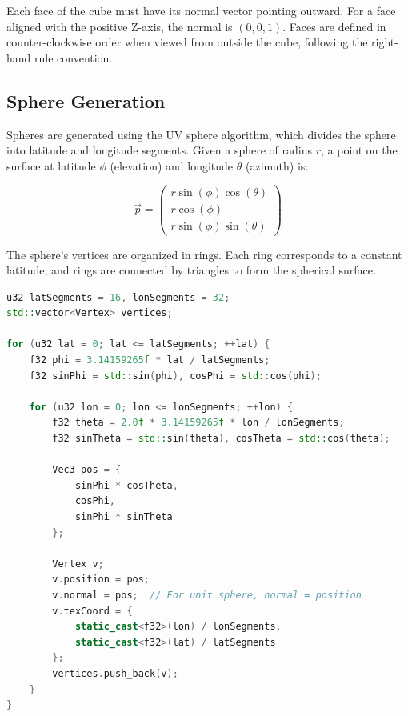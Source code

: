 Each face of the cube must have its normal vector pointing outward. For a face aligned with the positive Z-axis, the normal is $(0, 0, 1)$. Faces are defined in counter-clockwise order when viewed from outside the cube, following the right-hand rule convention.

\subsection{Sphere Generation}

Spheres are generated using the UV sphere algorithm, which divides the sphere into latitude and longitude segments. Given a sphere of radius $r$, a point on the surface at latitude $\phi$ (elevation) and longitude $\theta$ (azimuth) is:

\begin{equation}
    \vec{p} = \begin{pmatrix} r \sin(\phi) \cos(\theta) \\ r \cos(\phi) \\ r \sin(\phi) \sin(\theta) \end{pmatrix}
\end{equation}

The sphere's vertices are organized in rings. Each ring corresponds to a constant latitude, and rings are connected by triangles to form the spherical surface.

\begin{lstlisting}[language=C++, caption=UV Sphere Generation, basicstyle=\ttfamily\small]
u32 latSegments = 16, lonSegments = 32;
std::vector<Vertex> vertices;

for (u32 lat = 0; lat <= latSegments; ++lat) {
    f32 phi = 3.14159265f * lat / latSegments;
    f32 sinPhi = std::sin(phi), cosPhi = std::cos(phi);
    
    for (u32 lon = 0; lon <= lonSegments; ++lon) {
        f32 theta = 2.0f * 3.14159265f * lon / lonSegments;
        f32 sinTheta = std::sin(theta), cosTheta = std::cos(theta);
        
        Vec3 pos = {
            sinPhi * cosTheta,
            cosPhi,
            sinPhi * sinTheta
        };
        
        Vertex v;
        v.position = pos;
        v.normal = pos;  // For unit sphere, normal = position
        v.texCoord = {
            static_cast<f32>(lon) / lonSegments,
            static_cast<f32>(lat) / latSegments
        };
        vertices.push_back(v);
    }
}
\end{lstlisting}

